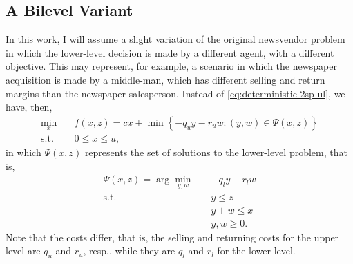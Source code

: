 \documentclass[12pt]{article}
\begin{document}
\subsection*{A Bilevel Variant}

In this work, I will assume a slight variation of the original newsvendor problem in which the lower-level decision is made by a different agent, with a different objective.
This may represent, for example, a scenario in which the newspaper acquisition is made by a middle-man, which has different selling and return margins than the newspaper salesperson. 
Instead of \eqref{eq:deterministic-2sp-ul}, we have, then,
\begin{equation}\label{eq:deterministic-bilevel-ul}
\begin{split}
    \min_{x} \quad & f(x,z) = cx + \min\left\{ -q_u y -r_u w : (y,w)\in \Psi(x,z) \right\}  \\
    \textrm{s.t.} \quad & 0\le x\le u
,\end{split}
\end{equation}
in which $\Psi(x,z)$ represents the set of solutions to the lower-level problem, that is,
\begin{equation}\label{eq:newsvendor-ll}
\begin{split}
    \Psi(x,z) = \arg\min_{y,w} \quad & -q_l y - r_l w \\
    \textrm{s.t.} \quad & y\le z \\
      & y+w \le x \\
      & y,w \ge 0
.\end{split}
\end{equation}
Note that the costs differ, that is, the selling and returning costs for the upper level are $q_u$ and $r_u$, resp., while they are $q_l$ and $r_l$ for the lower level.
\end{document}
